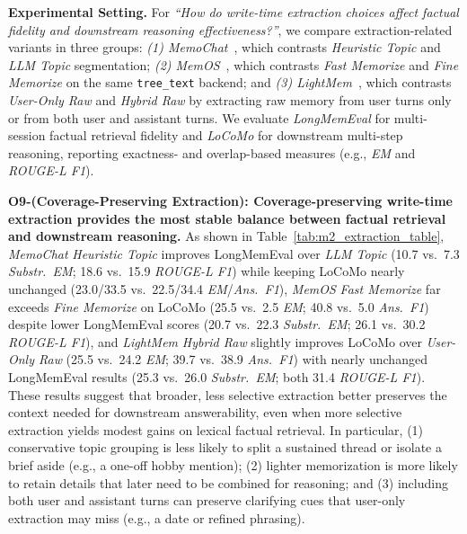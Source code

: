 \documentclass{llmxive}
\begin{document}
\noindent \textbf{Experimental Setting.}
For \textit{``How do write-time extraction choices affect factual fidelity and downstream reasoning effectiveness?''}, we compare extraction-related variants in three groups:
\textit{(1) MemoChat}~\cite{Memochat}, which contrasts \textit{Heuristic Topic} and \textit{LLM Topic} segmentation;
\textit{(2) MemOS}~\cite{MemOS}, which contrasts \textit{Fast Memorize} and \textit{Fine Memorize} on the same \texttt{tree\_text} backend;
and \textit{(3) LightMem}~\cite{LightMem}, which contrasts \textit{User-Only Raw} and \textit{Hybrid Raw} by extracting raw memory from user turns only or from both user and assistant turns.
We evaluate \textit{LongMemEval} for multi-session factual retrieval fidelity and \textit{LoCoMo} for downstream multi-step reasoning, reporting exactness- and overlap-based measures (e.g., \textit{EM} and \textit{ROUGE-L F1}).

\noindent \textbf{O9-(Coverage-Preserving Extraction): Coverage-preserving write-time extraction provides the most stable balance between factual retrieval and downstream reasoning.}
As shown in Table~\ref{tab:m2_extraction_table}, \textit{MemoChat} \textit{Heuristic Topic} improves LongMemEval over \textit{LLM Topic} (10.7 vs.\ 7.3 \textit{Substr.\ EM}; 18.6 vs.\ 15.9 \textit{ROUGE-L F1}) while keeping LoCoMo nearly unchanged (23.0/33.5 vs.\ 22.5/34.4 \textit{EM}/\textit{Ans.\ F1}), \textit{MemOS} \textit{Fast Memorize} far exceeds \textit{Fine Memorize} on LoCoMo (25.5 vs.\ 2.5 \textit{EM}; 40.8 vs.\ 5.0 \textit{Ans.\ F1}) despite lower LongMemEval scores (20.7 vs.\ 22.3 \textit{Substr.\ EM}; 26.1 vs.\ 30.2 \textit{ROUGE-L F1}), and \textit{LightMem} \textit{Hybrid Raw} slightly improves LoCoMo over \textit{User-Only Raw} (25.5 vs.\ 24.2 \textit{EM}; 39.7 vs.\ 38.9 \textit{Ans.\ F1}) with nearly unchanged LongMemEval results (25.3 vs.\ 26.0 \textit{Substr.\ EM}; both 31.4 \textit{ROUGE-L F1}).
These results suggest that broader, less selective extraction better preserves the context needed for downstream answerability, even when more selective extraction yields modest gains on lexical factual retrieval.
In particular, (1) conservative topic grouping is less likely to split a sustained thread or isolate a brief aside (e.g., a one-off hobby mention); (2) lighter memorization is more likely to retain details that later need to be combined for reasoning; 
and (3) including both user and assistant turns can preserve clarifying cues that user-only extraction may miss (e.g., a date or refined phrasing).
\end{document}
